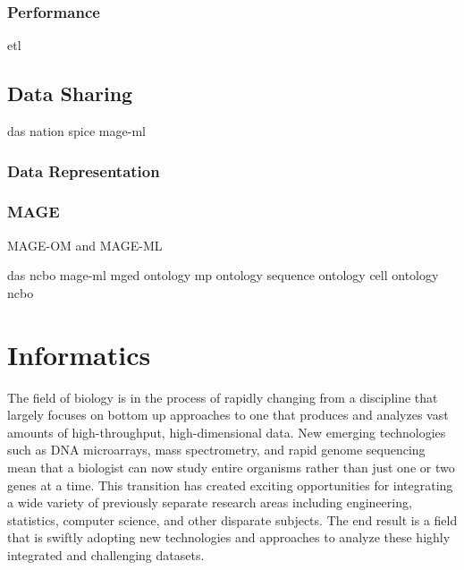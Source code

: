 {\subsubsection{Performance}
etl			\cite{kimball2004}
\subsection{Data Sharing}

das			\cite{PMID_11667947}
nation			\cite{nation}
spice			\cite{PMID_16204122}
mage-ml			\cite{PMID_12225585}

\subsubsection{Data Representation}
\subsubsection{MAGE}
\label{MAGE}
MAGE-OM and MAGE-ML

das			\cite{PMID_11667947}
ncbo			\cite{PMID_16901225}
mage-ml			\cite{PMID_12225585}
mged ontology		\cite{PMID_16428806}
mp ontology		\cite{PMID_15642099}
sequence ontology	\cite{PMID_15892872}
cell ontology		\cite{PMID_15693950}
ncbo			\cite{PMID_16901225}

\section{Informatics}
The field of biology is in the process of rapidly changing from a discipline
that largely focuses on bottom up approaches to one that produces and analyzes
vast amounts of high-throughput, high-dimensional data. New emerging
technologies such as DNA microarrays, mass spectrometry, and rapid genome
sequencing mean that a biologist can now study entire organisms rather than just
one or two genes at a time.  This transition has created exciting opportunities
for integrating a wide variety of previously separate research areas including
engineering, statistics, computer science, and other disparate subjects.  The
end result is a field that is swiftly adopting new technologies and approaches
to analyze these highly integrated and challenging datasets. 

}
